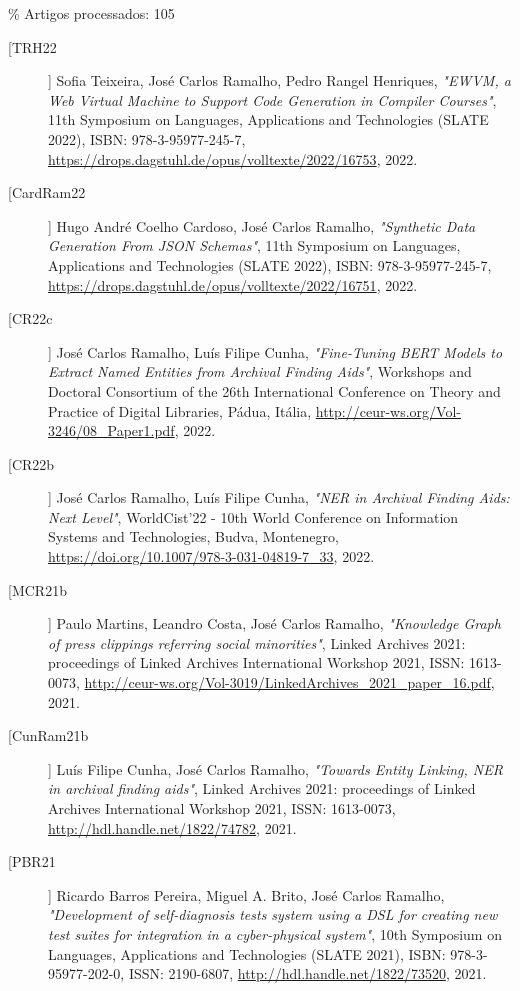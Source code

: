 \% Artigos processados: 105
\begin{description}

\item[[TRH22]]
    \textsf{Sofia Teixeira, José Carlos Ramalho, Pedro Rangel Henriques}, \emph{"EWVM, a Web Virtual Machine to Support Code Generation in Compiler Courses"}, 11th Symposium on Languages, Applications and Technologies (SLATE 2022), ISBN: 978-3-95977-245-7, \url{https://drops.dagstuhl.de/opus/volltexte/2022/16753}, 2022.

\item[[CardRam22]]
    \textsf{Hugo André Coelho Cardoso, José Carlos Ramalho}, \emph{"Synthetic Data Generation From JSON Schemas"}, 11th Symposium on Languages, Applications and Technologies (SLATE 2022), ISBN: 978-3-95977-245-7, \url{https://drops.dagstuhl.de/opus/volltexte/2022/16751}, 2022.

\item[[CR22c]]
    \textsf{José Carlos Ramalho, Luís Filipe Cunha}, \emph{"Fine-Tuning BERT Models to Extract Named Entities from Archival Finding Aids"}, Workshops and Doctoral Consortium of the 26th International Conference on Theory and Practice of Digital Libraries, Pádua, Itália, \url{http://ceur-ws.org/Vol-3246/08_Paper1.pdf}, 2022.

\item[[CR22b]]
    \textsf{José Carlos Ramalho, Luís Filipe Cunha}, \emph{"NER in Archival Finding Aids: Next Level"}, WorldCist'22 - 10th World Conference on Information Systems and Technologies, Budva, Montenegro, \url{https://doi.org/10.1007/978-3-031-04819-7_33}, 2022.


\item[[MCR21b]]
    \textsf{Paulo Martins, Leandro Costa, José Carlos Ramalho}, \emph{"Knowledge Graph of press clippings referring social minorities"}, Linked Archives 2021: proceedings of Linked Archives International Workshop 2021, ISSN: 1613-0073, \url{http://ceur-ws.org/Vol-3019/LinkedArchives_2021_paper_16.pdf}, 2021.

\item[[CunRam21b]]
    \textsf{Luís Filipe Cunha, José Carlos Ramalho}, \emph{"Towards Entity Linking, NER in archival finding aids"}, Linked Archives 2021: proceedings of Linked Archives International Workshop 2021, ISSN: 1613-0073, \url{http://hdl.handle.net/1822/74782}, 2021.

\item[[PBR21]]
    \textsf{Ricardo Barros Pereira, Miguel A. Brito, José Carlos Ramalho}, \emph{"Development of self-diagnosis tests system using a DSL for creating new test suites for integration in a cyber-physical system"}, 10th Symposium on Languages, Applications and Technologies (SLATE 2021), ISBN: 978-3-95977-202-0, ISSN: 2190-6807, \url{http://hdl.handle.net/1822/73520}, 2021.


\end{description}
